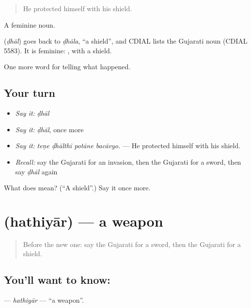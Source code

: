 \begin{quote}
He protected himself with his shield.
\end{quote}

A feminine noun.

\begin{cousinweb}
\textbf{} (\emph{ḍhāl}) goes back to \emph{ḍhāla}, \textquotedblleft{}a shield\textquotedblright{}, and CDIAL lists the Gujarati noun (CDIAL 5583). It is feminine: \textbf{}, with a shield.
\end{cousinweb}

\begin{grammarlens}[title={What you've built}]
One more word for telling what happened.
\end{grammarlens}

\subsection*{Your turn}
\begin{itemize}
\raggedright
  \item \emph{Say it:} \emph{ḍhāl}
  \item \emph{Say it:} \emph{ḍhāl}, once more
  \item \emph{Say it:} \emph{teṇe ḍhālthī potāne bacāvyo.} — He protected himself with his shield.
  \item \emph{Recall:} say the Gujarati for an invasion, then the Gujarati for a sword, then say \emph{ḍhāl} again
\end{itemize}

\begin{tcolorbox}[breakable,colback=teal!4,colframe=teal!35!black,title={Before you move on}]
What does  mean? (\textquotedblleft{}A shield\textquotedblright{}.) Say it once more.
\end{tcolorbox}
\section[\texorpdfstring{\gu{હથિયાર} (hathiyār)}{હથિયાર (hathiyār)}]{ (hathiyār) — a weapon}

\label{lesson:GU-C321-hathiyar}



\begin{quote}
Before the new one: say the Gujarati for a sword, then the Gujarati for a shield.
\end{quote}

\subsection*{You'll want to know: }
\textbf{} — \emph{hathiyār} — \textquotedblleft{}a weapon\textquotedblright{}.

